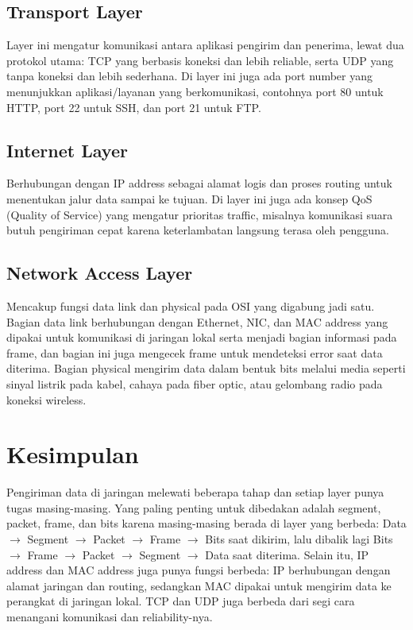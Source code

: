 \documentclass[11pt]{article}
\begin{document}
\subsection*{Transport Layer}
Layer ini mengatur komunikasi antara aplikasi pengirim dan penerima, lewat dua protokol utama: TCP yang berbasis koneksi dan lebih reliable, serta UDP yang tanpa koneksi dan lebih sederhana. Di layer ini juga ada port number yang menunjukkan aplikasi/layanan yang berkomunikasi, contohnya port 80 untuk HTTP, port 22 untuk SSH, dan port 21 untuk FTP.

\subsection*{Internet Layer}
Berhubungan dengan IP address sebagai alamat logis dan proses routing untuk menentukan jalur data sampai ke tujuan. Di layer ini juga ada konsep QoS (Quality of Service) yang mengatur prioritas traffic, misalnya komunikasi suara butuh pengiriman cepat karena keterlambatan langsung terasa oleh pengguna.

\subsection*{Network Access Layer}
Mencakup fungsi data link dan physical pada OSI yang digabung jadi satu. Bagian data link berhubungan dengan Ethernet, NIC, dan MAC address yang dipakai untuk komunikasi di jaringan lokal serta menjadi bagian informasi pada frame, dan bagian ini juga mengecek frame untuk mendeteksi error saat data diterima. Bagian physical mengirim data dalam bentuk bits melalui media seperti sinyal listrik pada kabel, cahaya pada fiber optic, atau gelombang radio pada koneksi wireless.

\section*{Kesimpulan}

Pengiriman data di jaringan melewati beberapa tahap dan setiap layer punya tugas masing-masing. Yang paling penting untuk dibedakan adalah segment, packet, frame, dan bits karena masing-masing berada di layer yang berbeda: Data $\to$ Segment $\to$ Packet $\to$ Frame $\to$ Bits saat dikirim, lalu dibalik lagi Bits $\to$ Frame $\to$ Packet $\to$ Segment $\to$ Data saat diterima. Selain itu, IP address dan MAC address juga punya fungsi berbeda: IP berhubungan dengan alamat jaringan dan routing, sedangkan MAC dipakai untuk mengirim data ke perangkat di jaringan lokal. TCP dan UDP juga berbeda dari segi cara menangani komunikasi dan reliability-nya.
\end{document}
